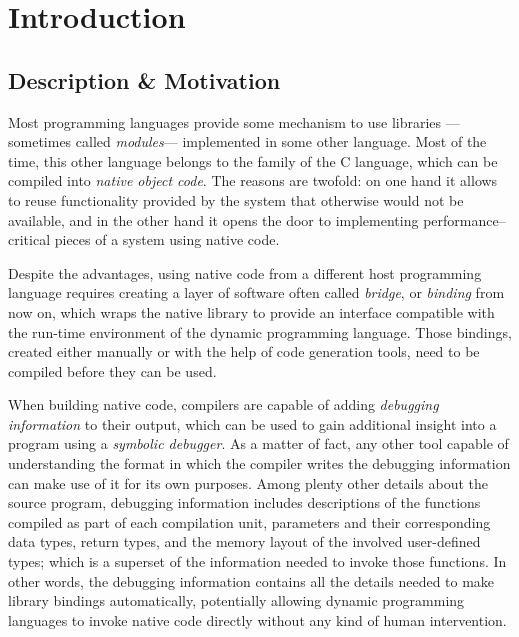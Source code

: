 
\chapter{Introduction}

\section{Description \& Motivation}

Most programming languages provide some mechanism to use libraries —sometimes
called \emph{modules}— implemented in some other language. Most of the time,
this other language belongs to the family of the C language, which can be
compiled into \emph{native object code}. The reasons are twofold: on one hand
it allows to reuse functionality provided by the system that otherwise would
not be available, and in the other hand it opens the door to implementing
performance--critical pieces of a system using native code.

Despite the advantages, using native code from a different host programming
language requires creating a layer of software often called \emph{bridge}, or
\emph{binding} from now on, which wraps the native library to provide an
interface compatible with the run-time environment of the dynamic programming
language. Those bindings, created either manually or with the help of code
generation tools, need to be compiled before they can be used.

When building native code, compilers are capable of adding
\emph{debugging information} to their output, which can be used to gain
additional insight into a program using a \emph{symbolic debugger}. As
a matter of fact, any other tool capable of understanding the format in which
the compiler writes the debugging information can make use of it for its own
purposes. Among plenty other details about the source program, debugging
information includes descriptions of the functions compiled as part of each
compilation unit, parameters and their corresponding data types, return types,
and the memory layout of the involved user-defined types; which is a superset
of the information needed to invoke those functions. In other words, the
debugging information contains all the details needed to make library bindings
automatically, potentially allowing dynamic programming languages to invoke
native code directly without any kind of human intervention.



